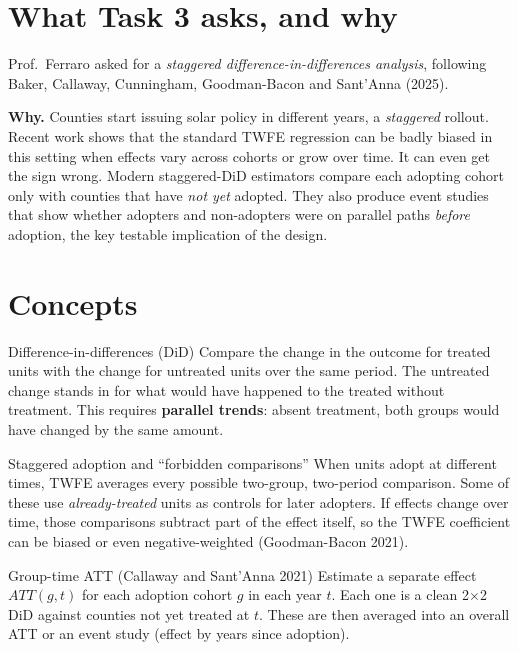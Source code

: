 \documentclass[11pt]{article}
\begin{document}
\tableofcontents

\section{What Task 3 asks, and why}
Prof.\ Ferraro asked for a \emph{staggered difference-in-differences analysis}, following Baker, Callaway, Cunningham, Goodman-Bacon and Sant'Anna (2025).

\textbf{Why.} Counties start issuing solar policy in different years, a \emph{staggered} rollout. Recent work shows that the standard TWFE regression can be badly biased in this setting when effects vary across cohorts or grow over time. It can even get the sign wrong. Modern staggered-DiD estimators compare each adopting cohort only with counties that have \emph{not yet} adopted. They also produce event studies that show whether adopters and non-adopters were on parallel paths \emph{before} adoption, the key testable implication of the design.

\section{Concepts}

\begin{conceptbox}{Difference-in-differences (DiD)}
Compare the change in the outcome for treated units with the change for untreated units over the same period. The untreated change stands in for what would have happened to the treated without treatment. This requires \textbf{parallel trends}: absent treatment, both groups would have changed by the same amount.
\end{conceptbox}

\begin{conceptbox}{Staggered adoption and ``forbidden comparisons''}
When units adopt at different times, TWFE averages every possible two-group, two-period comparison. Some of these use \emph{already-treated} units as controls for later adopters. If effects change over time, those comparisons subtract part of the effect itself, so the TWFE coefficient can be biased or even negative-weighted (Goodman-Bacon 2021).
\end{conceptbox}

\begin{conceptbox}{Group-time ATT (Callaway and Sant'Anna 2021)}
Estimate a separate effect $ATT(g,t)$ for each adoption cohort $g$ in each year $t$. Each one is a clean 2$\times$2 DiD against counties not yet treated at $t$. These are then averaged into an overall ATT or an event study (effect by years since adoption).
\end{conceptbox}
\end{document}
